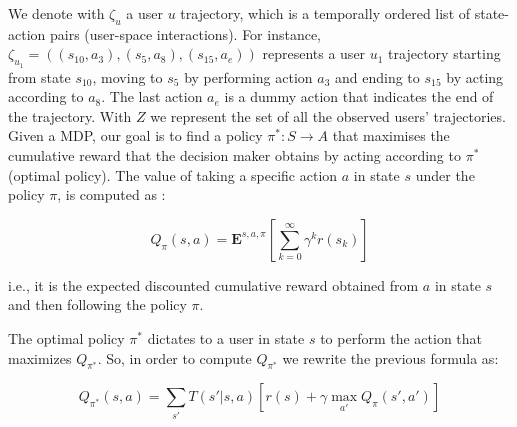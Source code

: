 %
We denote with $\zeta_u$ a user $u$ trajectory,
which is a temporally ordered list of state-action pairs (user-space interactions). 
For instance, $\zeta_{u_1} = ((s_{10},a_{3}), (s_5,a_8), (s_{15}, a_e))$ represents a user $u_1$ trajectory starting from state $s_{10}$, moving to $s_5$ by performing action $a_3$ 
and ending to $s_{15}$ by acting according to $a_8$. The last action $a_e$ is a dummy action that indicates the end of the trajectory. With $Z$ we represent the set of all the observed users' trajectories. 
%
Given a MDP, our goal is to find a policy $\pi^* : S \rightarrow A$ that maximises the cumulative reward that the decision maker obtains by acting according to $\pi^*$ (optimal policy). 
The value of taking a specific action $a$ in state $s$ under the policy $\pi$, is computed as :

$$Q_{\pi}(s,a)=\mathbf{E}^{s,a,\pi}[\sum_{k=0}^{\infty} \gamma^k r(s_k)]$$

i.e., it is the expected discounted cumulative reward obtained from $a$ in state $s$ and then following the policy $\pi$.


The optimal policy $\pi^*$ dictates to a user in state $s$ to perform the action that maximizes $Q_{\pi^*}$. So, in order to compute $Q_{\pi^*}$ we rewrite the previous formula as:

$$Q_{\pi^*}(s,a) = \sum_{s'}T(s'|s,a)\left[r(s)+\gamma \max_{a'}{Q_{\pi}(s',a')}\right]$$


